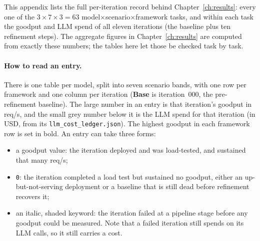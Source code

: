 \label{ch:appendix-per-iteration}

This appendix lists the full per-iteration record behind
Chapter~\ref{ch:results}: every one of the $3\times7\times3=63$
model$\times$scenario$\times$framework tasks, and within each task the
goodput and LLM spend of all eleven iterations (the baseline plus ten
refinement steps). The aggregate figures in Chapter~\ref{ch:results} are
computed from exactly these numbers; the tables here let those be checked
task by task.

\paragraph{How to read an entry.} There is one table per model, split into
seven scenario bands, with one row per framework and one column per
iteration (\textbf{Base} is iteration~000, the pre-refinement baseline).
The large number in an entry is that iteration's goodput in req/s, and the
small grey number below it is the LLM spend for that iteration (in USD,
from its \texttt{llm\_cost\_ledger.json}). The highest goodput in each
framework row is set in bold. An entry can take three forms:

\begin{itemize}
  \item a goodput value: the iteration deployed and was load-tested, and
    sustained that many req/s;
  \item \texttt{0}: the iteration completed a load test but sustained no
    goodput, either an up-but-not-serving deployment or a baseline that is
    still dead before refinement recovers it;
  \item an italic, shaded keyword: the iteration failed at a pipeline
    stage before any goodput could be measured. Note that a failed
    iteration still spends on its LLM calls, so it still carries a cost.
\end{itemize}

